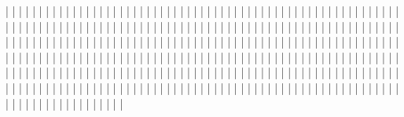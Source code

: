 |           |
|           |
|           |
|           |
|           |
|           |
|           |
|           |
|           |
|           |
|           |
|           |
|           |
|           |
|           |
|           |
|           |
|           |
|           |
|           |
|           |
|           |
|           |
|           |
|           |
|           |
|           |
|           |
|           |
|           |
|           |
|           |
|           |
|           |
|           |
|           |
|           |
|           |
|           |
|           |
|           |
|           |
|           |
|           |
|           |
|           |
|           |
|           |
|           |
|           |
|           |
|           |
|           |
|           |
|           |
|           |
|           |
|           |
|           |
|           |
|           |
|           |
|           |
|           |
|           |
|           |
|           |
|           |
|           |
|           |
|           |
|           |
|           |
|           |
|           |
|           |
|           |
|           |
|           |
|           |
|           |
|           |
|           |
|           |
|           |
|           |
|           |
|           |
|           |
|           |
|           |
|           |
|           |
|           |
|           |
|           |
|           |
|           |
|           |
|           |
|           |
|           |
|           |
|           |
|           |
|           |
|           |
|           |
|           |
|           |
|           |
|           |
|           |
|           |
|           |
|           |
|           |
|           |
|           |
|           |
|           |
|           |
|           |
|           |
|           |
|           |
|           |
|           |
|           |
|           |
|           |
|           |
|           |
|           |
|           |
|           |
|           |
|           |
|           |
|           |
|           |
|           |
|           |
|           |
|           |
|           |
|           |
|           |
|           |
|           |
|           |
|           |
|           |
|           |
|           |
|           |
|           |
|           |
|           |
|           |
|           |
|           |
|           |
|           |
|           |
|           |
|           |
|           |
|           |
|           |
|           |
|           |
|           |
|           |
|           |
|           |
|           |
|           |
|           |
|           |
|           |
|           |
|           |
|           |
|           |
|           |
